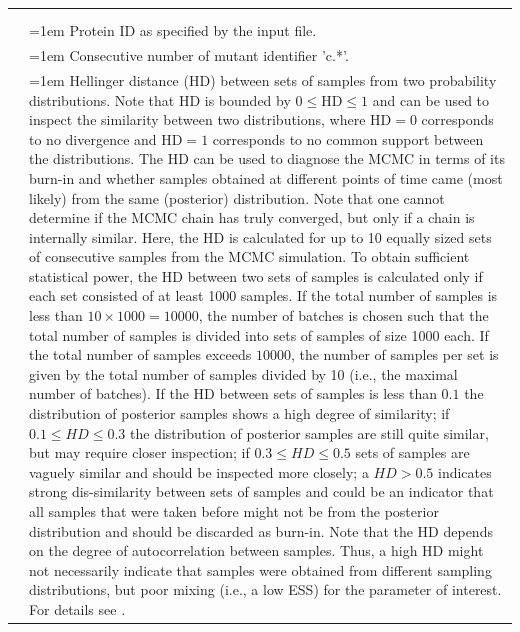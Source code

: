 \documentclass[12pt,a4paper]{scrartcl}
\newcommand{\mc}[3]{\multicolumn{#1}{#2}{#3}}
\begin{document}
{\begin{scriptsize}
\begin{tabularx}{1\textwidth}{>{\raggedright\arraybackslash}m{1.6cm}>{\raggedright\arraybackslash}m{11.2cm}}
\\
&\\
\mc{1}{l}{.*\_Diag\_C} &   \\\cline{1-1}
\mc{1}{r}{protID} & 
\hangindent=1em
\hangafter=1
\noindent
Protein ID as specified by the input file.
\\
\mc{1}{r}{mutant} & 
\hangindent=1em
\hangafter=1
\noindent
Consecutive number of mutant identifier 'c.*'. 
\\
\mc{1}{r}{HD(*)} & 
\hangindent=1em
\hangafter=1
\noindent
Hellinger distance (HD) between sets of samples from two probability distributions. Note that HD is bounded by $0\leq \text{HD} \leq 1$ and can be used to inspect the similarity between two distributions, where $\text{HD}=0$ corresponds to no divergence and $\text{HD}=1$ corresponds to no common support between the distributions. The HD can be used to diagnose the MCMC in terms of its burn-in and whether samples obtained at different points of time came (most likely) from the same (posterior) distribution. Note that one cannot determine if the MCMC chain has truly converged, but only if a chain is internally similar.
Here, the HD is calculated for up to 10 equally sized sets of consecutive samples from the MCMC simulation.
To obtain sufficient statistical power, the HD between two sets of samples is calculated only if each set consisted of at least 1000 samples. 
If the total number of samples is less than $10\times 1000 = 10000$, the number of batches is chosen such that the total number of samples is divided into sets of samples of size 1000 each. If the total number of samples exceeds $10000$, the number of samples per set is given by the total number of samples divided by 10 (i.e., the maximal number of batches).
If the HD between sets of samples is less than $0.1$ the distribution of posterior samples shows a high degree of similarity; if $0.1\leq HD\leq 0.3$ the distribution of posterior samples are still quite similar, but may require closer inspection; if $0.3\leq HD\leq 0.5$ sets of samples are vaguely similar and should be inspected more closely; a $HD>0.5$ indicates strong dis-similarity between sets of samples and could be an indicator that all samples that were taken before might not be from the posterior distribution and should be discarded as burn-in.
Note that the HD depends on the degree of autocorrelation between samples. Thus, a high HD might not necessarily indicate that samples were obtained from different sampling distributions, but poor mixing (i.e., a low ESS) for the parameter of interest.
For details see \cite{BooMK14}.

\end{tabularx}
\end{scriptsize}}
\end{document}
